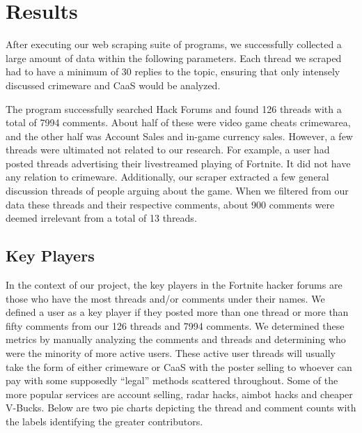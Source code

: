 \documentclass[sigconf]{acmart}
\begin{document}
\section{Results}

After executing our web scraping suite of programs, we successfully collected
a large amount of data within the following parameters. Each thread we scraped
had to have a minimum of 30 replies to the topic, ensuring that only intensely
discussed crimeware and CaaS would be analyzed. 

The program successfully searched Hack Forums and found 126 threads with a total
of 7994 comments. About half of these were video game cheats crimewarea, and the
other half was Account Sales and in-game currency sales. However, a few threads 
were ultimated not related to our research. For example, a user had posted
threads advertising their livestreamed playing of Fortnite. It did not have
any relation to crimeware. Additionally, our scraper extracted a few general
discussion threads of people arguing about the game. When we filtered from our
data these threads and their respective comments, about 900 comments were deemed
irrelevant from a total of 13 threads.

\subsection{Key Players}
In the context of our project, the key players in the Fortnite hacker forums are those who have the most threads and/or comments under their names. We defined a user as a key player if they posted more than one thread or more than fifty comments from our 126 threads and 7994 comments. We determined these metrics by manually analyzing the comments and threads and determining who were the minority of more active users. These active user threads will usually take the form of either crimeware or CaaS with the poster selling to whoever can pay with some supposedly “legal” methods scattered throughout. Some of the more popular services are account selling, radar hacks, aimbot hacks and cheaper V-Bucks. Below are two pie charts depicting the thread and comment counts with the labels identifying the greater contributors.
\end{document}
